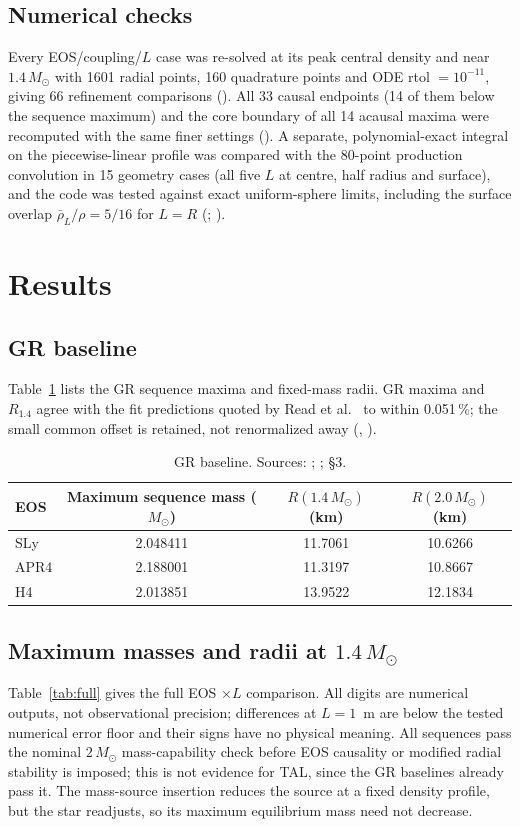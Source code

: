 \documentclass[11pt,a4paper]{article}
\newcommand{\Msun}{M_\odot}
\begin{document}
\subsection{Numerical checks}
Every EOS/coupling/$L$ case was re-solved at its peak central density and near $1.4\,\Msun$ with 1601
radial points, 160 quadrature points and ODE rtol $=10^{-11}$, giving 66 refinement comparisons
(). All 33 causal endpoints (14 of them below the sequence maximum) and the core
boundary of all 14 acausal maxima were recomputed with the same finer settings
(). A separate, polynomial-exact integral on the piecewise-linear profile
was compared with the 80-point production convolution in 15 geometry cases (all five $L$ at centre, half
radius and surface), and the code was tested against exact uniform-sphere limits, including the surface
overlap $\bar\rho_L/\rho=5/16$ for $L=R$ (; ).

\section{Results}
\subsection{GR baseline}
Table~\ref{tab:gr} lists the GR sequence maxima and fixed-mass radii. GR maxima and $R_{1.4}$ agree with the
fit predictions quoted by Read et al.\ \cite{read} to within 0.051\,\%; the small common offset is retained, not
renormalized away (, ).

\begin{table}[t]
\centering
\caption[]{GR baseline. Sources: ; ;  \S3.}
\label{tab:gr}
\begin{tabular}{lccc}
\toprule
EOS & Maximum sequence mass ($\Msun$) & $R(1.4\,\Msun)$ (km) & $R(2.0\,\Msun)$ (km)\\
\midrule
SLy & 2.048411 & 11.7061 & 10.6266\\
APR4 & 2.188001 & 11.3197 & 10.8667\\
H4 & 2.013851 & 13.9522 & 12.1834\\
\bottomrule
\end{tabular}
\end{table}

\subsection{Maximum masses and radii at $1.4\,\Msun$}
Table~\ref{tab:full} gives the full EOS $\times L$ comparison. All digits are numerical outputs, not
observational precision; differences at $L=1$~m are below the tested numerical error floor and their signs
have no physical meaning. All sequences pass the nominal $2\,\Msun$ mass-capability check before EOS causality
or modified radial stability is imposed; this is not evidence for TAL, since the GR baselines already pass it.
The mass-source insertion reduces the source at a fixed density profile, but the star readjusts, so its
maximum equilibrium mass need not decrease.
\end{document}
